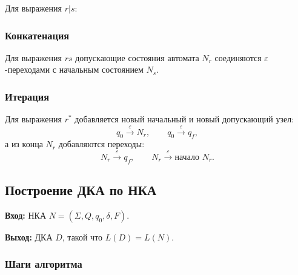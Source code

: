 \documentclass[12pt,a4paper]{article}
\newcommand{\eps}{\varepsilon}
\begin{document}
Для выражения $r|s$:

\begin{center}
\end{center}

\subsubsection*{Конкатенация}

Для выражения $rs$ допускающие состояния автомата $N_r$ соединяются $\eps$-переходами с начальным состоянием $N_s$.

\subsubsection*{Итерация}

Для выражения $r^*$ добавляется новый начальный и новый допускающий узел:
\[
q_0 \xrightarrow{\eps} N_r,\qquad
q_0\xrightarrow{\eps}q_f,
\]
а из конца $N_r$ добавляются переходы:
\[
N_r \xrightarrow{\eps} q_f,\qquad
N_r \xrightarrow{\eps} \text{начало } N_r.
\]

\subsection{Построение ДКА по НКА}

\textbf{Вход:} НКА $N=(\Sigma,Q,q_0,\delta,F)$.

\textbf{Выход:} ДКА $D$, такой что $L(D)=L(N)$.

\subsubsection*{Шаги алгоритма}
\end{document}
